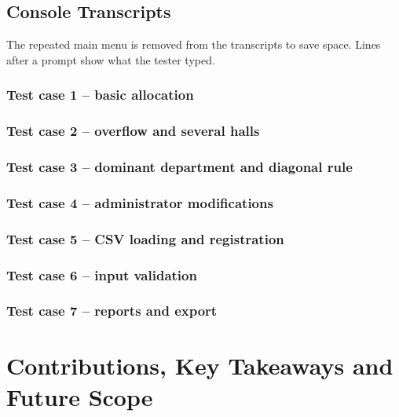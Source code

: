 \documentclass[12pt,a4paper]{report}
\begin{document}
\section{Console Transcripts}
The repeated main menu is removed from the transcripts to save space. Lines after a prompt show what the tester typed.

\subsection*{Test case 1 -- basic allocation}

\subsection*{Test case 2 -- overflow and several halls}

\subsection*{Test case 3 -- dominant department and diagonal rule}

\subsection*{Test case 4 -- administrator modifications}

\subsection*{Test case 5 -- CSV loading and registration}

\subsection*{Test case 6 -- input validation}

\subsection*{Test case 7 -- reports and export}


\chapter{Contributions, Key Takeaways and Future Scope}
\end{document}
